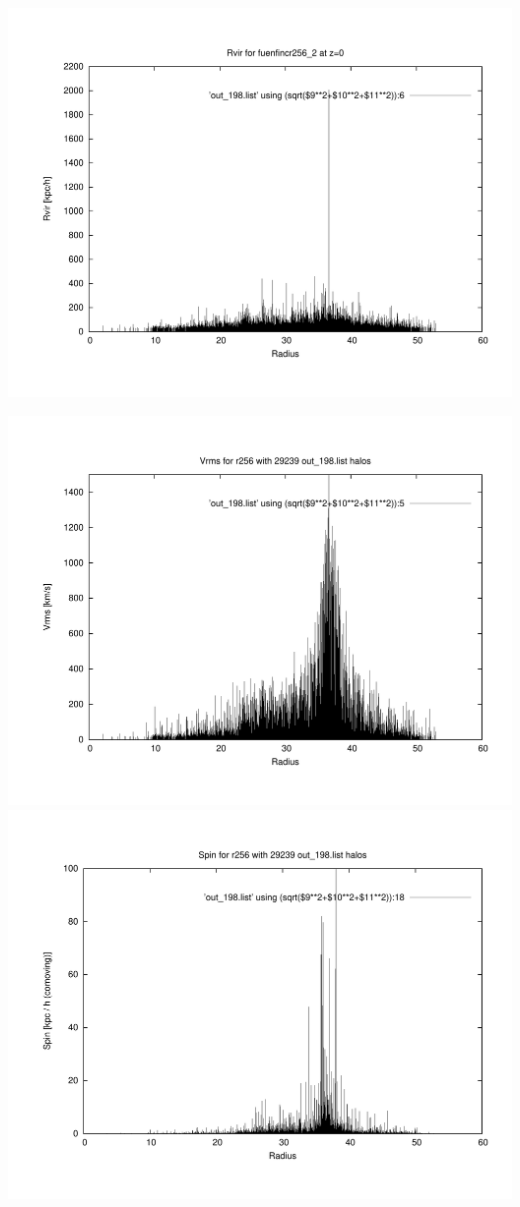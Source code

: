 \includegraphics[scale=0.3]{fuenfincr256_2/plot_rvir_z0.pdf}

\includegraphics[scale=0.3]{fuenfincr256_2/plot_Vrms_out_198.pdf}
\includegraphics[scale=0.3]{fuenfincr256_2/plot_spin_out_198.pdf}


